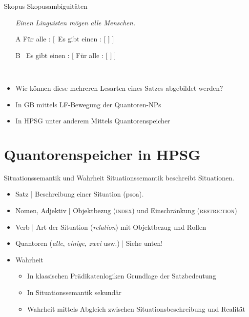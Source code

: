 \begin{frame}
  {Skopus}
  \onslide<+->
  \onslide<+->
  Skopusambiguitäten\\
  \Zeile 
  \begin{itemize}[<+->]
    \item[ ] \textit{Einen Linguisten mögen alle Menschen.}
      \Zeile
    \item[A] Für \alert{alle}  {\footnotesize{}} : [ Es gibt \alert{einen}  {\footnotesize{}} : [ {\footnotesize{}}  {\footnotesize{}} ] ]
    \item[B] Es gibt \alert{einen}  {\footnotesize{}} : [ Für \alert{alle}  {\footnotesize{}} : [ {\footnotesize{}}  {\footnotesize{}} ] ]
    \item[~] 
      \Zeile
    \item Wie können diese mehreren Lesarten eines Satzes abgebildet werden?
    \item In GB mittels LF-Bewegung der Quantoren-NPs
    \item In HPSG unter anderem Mittels \alert{Quantorenspeicher} 
  \end{itemize}
\end{frame}

\section{Quantorenspeicher in HPSG}

\begin{frame}
  {Situationssemantik und Wahrheit}
  \onslide<+->
  \onslide<+->
  Situationssemantik \alert{beschreibt Situationen}.\\
  \Halbzeile
  \begin{itemize}[<+->]
    \item \alert{Satz} | Beschreibung einer \alert{Situation} (psoa).
    \item \alert{Nomen}, \alert{Adjektiv} | \alert{Objektbezug} (\textsc{index}) und \alert{Einschränkung} (\textsc{restriction})
    \item \alert{Verb} | \alert{Art der Situation} (\textit{relation}) mit \alert{Objektbezug} und \alert{Rollen}
    \item \alert{Quantoren} (\textit{alle}, \textit{einige}, \textit{zwei} usw.) | Siehe unten!
      \Halbzeile
    \item \alert{Wahrheit}
      \begin{itemize}[<+->]
        \item In klassischen Prädikatenlogiken Grundlage der Satzbedeutung
        \item In Situationssemantik sekundär
        \item Wahrheit mittels Abgleich zwischen Situationsbeschreibung und Realität
      \end{itemize}
  \end{itemize}
\end{frame}


